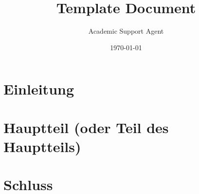\documentclass{article}
\title{Template Document}
\author{Academic Support Agent}
\date{\today}
\begin{document}
\maketitle


\pagestyle{fancy}
\thispagestyle{empty}



\newpage

\newpage

\newpage



\newpage
{}
\setcounter{page}{6} %

\section{Einleitung}


\section{Hauptteil (oder Teil des Hauptteils)}


\section{Schluss}


\newpage
\end{document}
